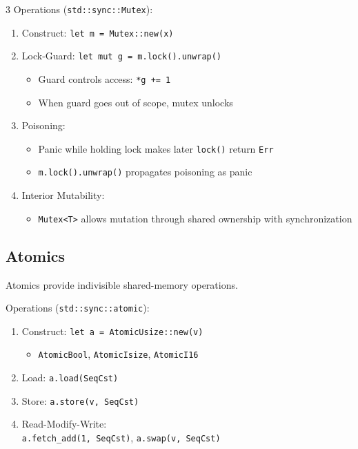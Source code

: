 \documentclass[12pt, a4paper]{article}
\begin{document}
\begin{multicols*}{3}
Operations (\lstinline|std::sync::Mutex|):
\begin{enumerate}[\roman*.]
  \item Construct: \lstinline|let m = Mutex::new(x)|
  \item Lock-Guard: \lstinline|let mut g = m.lock().unwrap()|
  \begin{itemize}[leftmargin=*]\vspace{3pt}
    \item Guard controls access: \lstinline|*g += 1|
    \item When guard goes out of scope, mutex unlocks
  \end{itemize}
  \item Poisoning:
  \begin{itemize}[leftmargin=*]\vspace{3pt}
    \item Panic while holding lock makes later \lstinline|lock()| return \lstinline|Err|
    \item \lstinline|m.lock().unwrap()| propagates poisoning as panic
  \end{itemize}
  \item Interior Mutability:
  \begin{itemize}[leftmargin=*]\vspace{3pt}
    \item \lstinline|Mutex<T>| allows mutation through shared ownership with synchronization
  \end{itemize}
\end{enumerate}

\subsection{Atomics}
Atomics provide indivisible shared-memory operations.

Operations (\lstinline|std::sync::atomic|):
\begin{enumerate}[\roman*.]
  \item Construct: \lstinline|let a = AtomicUsize::new(v)|
  \begin{itemize}[leftmargin=*]\vspace{3pt}
    \item \lstinline|AtomicBool|, \lstinline|AtomicIsize|, \lstinline|AtomicI16|
  \end{itemize}
  \item Load: \lstinline|a.load(SeqCst)|
  \item Store: \lstinline|a.store(v, SeqCst)|
  \item Read-Modify-Write:\\\lstinline|a.fetch_add(1, SeqCst)|, \lstinline|a.swap(v, SeqCst)|
\end{enumerate}


\end{multicols*}
\end{document}
